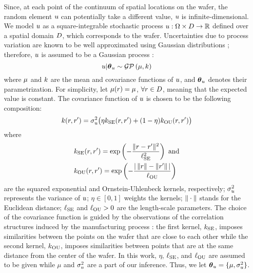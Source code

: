 Since, at each point of the continuum of spatial locations on the wafer, the random element $u$ can potentially take a different value, $u$ is infinite-dimensional. We model $u$ as a square-integrable stochastic process $u: \Omega \times D \to \mathbb{R}$ defined over a spatial domain $D$, which corresponds to the wafer. Uncertainties due to process variation are known to be well approximated using Gaussian distributions \cite{srivastava2010}; therefore, $u$ is assumed to be a Gaussian process \cite{rasmussen2006}:
\[
  \u | \vparam_\u \sim \gaussianp{\fMean}{\fCov}
\]
where $\fMean$ and $\fCov$ are the mean and covariance functions of $u$, and ${\boldsymbol\theta}_u$ denotes their parametrization. For simplicity, let $\fMean{\r} = \mu$, $\forall r \in D$, meaning that the expected value is constant. The covariance function of $u$ is chosen to be the following composition:
\begin{equation} \elabel{covariance-function}
  \fCov{\r, \r'} = \sigma_\u^2 \big( \eta \fCov_\SE(\r, \r') + (1 - \eta) \fCov_\OU(\r, \r') \big)
\end{equation}
where
\begin{align*}
  & \fCov_\SE(\r, \r') = \exp\left(-\frac{\norm{\r - \r'}^2}{\ell_\SE^2}\right) \text{ and} \\
  & \fCov_\OU(\r, \r') = \exp\left(- \frac{\abs{\,\norm{\r} - \norm{\r'}\,}}{\ell_\OU} \right)
\end{align*}
are the squared exponential and Ornstein-Uhlenbeck kernels, respectively; $\sigma_u^2$ represents the variance of $u$; $\eta \in [0, 1]$ weights the kernels; $\| \cdot \|$ stands for the Euclidean distance; $\ell_{\text{SE}}$ and $\ell_{\text{OU}} > 0$ are the length-scale parameters. The choice of the covariance function is guided by the observations of the correlation structures induced by the manufacturing process \cite{cheng2011}: the first kernel, $\fCov_\SE$, imposes similarities between the points on the wafer that are close to each other while the second kernel, $\fCov_\OU$, imposes similarities between points that are at the same distance from the center of the wafer. In this work, $\eta$, $\ell_{\text{SE}}$, and $\ell_{\text{OU}}$ are assumed to be given while $\mu$ and $\sigma^2_u$ are a part of our inference. Thus, we let ${\boldsymbol\theta}_u = \{ \mu, \sigma_u^2 \}$.

